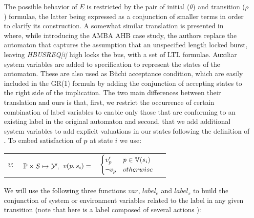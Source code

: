 The possible behavior of $E$ is restricted by the pair of initial ($\theta$) and transition ($\rho$) formulae, the latter being expressed as a conjunction of smaller terms in order to clarify its construction.  
A somewhat similar translation is presented in ~\cite{bloem2012synthesis} where, while introducing the AMBA AHB case study, the authors replace the automaton that captures the assumption that an unspecified length locked burst, leaving \emph{HBUSREQ[i]} high locks the bus, with a set of LTL formulae. Auxiliar system variables are added to specification to represent the states of the automaton. These are also used as Büchi acceptance condition, which are easily included in the GR(1) formula by adding the conjunction of accepting states to the right side of the implication.
The two main differences between their translation and ours is that, first, we restrict the occurrence of certain combination of label variables to enable only those that are conforming to an existing label in the original automaton and second, that we add additional system variables to add explicit valuations in our states following the definition of \valuations.
To embed satisfaction of $p$ at state $i$ we use:
\begin{center}
	\begin{tabular}{r r r l}
$v:$ & $\mathbb{P} \times S \mapsto {\mathcal{Y}}',$
$
v(p,s_i) = $ & $\begin{cases}
v_{p}' & p \in \mathbb{V}(s_i) \\
\neg v_{p} & otherwise
\end{cases}
$
\end{tabular}
\end{center}
We will use the following three functions $var$, $label_e$ and $label_s$ to build the conjunction of system or environment variables related to the label in any given transition (note that here \actionLabel is a label composed of several actions \action):
